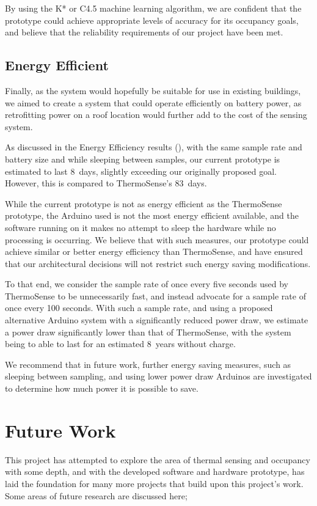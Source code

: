 \documentclass[../thesis/thesis.tex]{subfiles}
\begin{document}
By using the K* or C4.5 machine learning algorithm, we are confident that the prototype could achieve appropriate levels of accuracy for its occupancy goals, and believe that the reliability requirements of our project have been met.

\subsection{Energy Efficient}
Finally, as the system would hopefully be suitable for use in existing buildings, we aimed to create a system that could operate efficiently on battery power, as retrofitting power on a roof location would further add to the cost of the sensing system.

As discussed in the Energy Efficiency results (), with the same sample rate and battery size and while sleeping between samples, our current prototype is estimated to last 8~days, slightly exceeding our originally proposed goal. However, this is compared to ThermoSense's 83~days.

While the current prototype is not as energy efficient as the ThermoSense prototype, the Arduino used is not the most energy efficient available, and the software running on it makes no attempt to sleep the hardware while no processing is occurring. We believe that with such measures, our prototype could achieve similar or better energy efficiency than ThermoSense, and have ensured that our architectural decisions will not restrict such energy saving modifications.

To that end, we consider the sample rate of once every five seconds used by ThermoSense to be unnecessarily fast, and instead advocate for a sample rate of once every 100 seconds. With such a sample rate, and using a proposed alternative Arduino system with a significantly reduced power draw, we estimate a power draw significantly lower than that of ThermoSense, with the system being to able to last for an estimated 8~years without charge.

We recommend that in future work, further energy saving measures, such as sleeping between sampling, and using lower power draw Arduinos are investigated to determine how much power it is possible to save.

\section{Future Work}
This project has attempted to explore the area of thermal sensing and occupancy with some depth, and with the developed software and hardware prototype, has laid the foundation for many more projects that build upon this project's work. Some areas of future research are discussed here;
\end{document}
